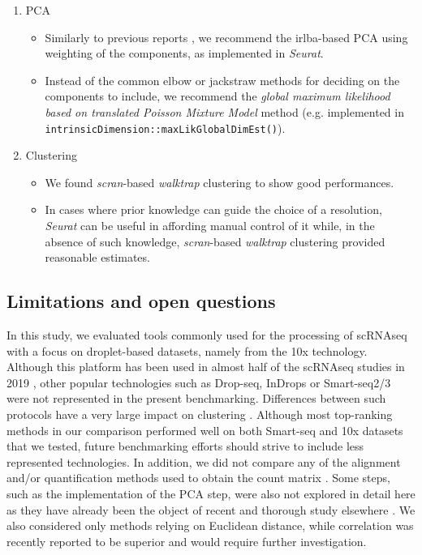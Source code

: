 \documentclass{bmcart}
\begin{document}
\begin{enumerate}
\begin{itemize}
   \end{itemize}
   \item PCA
   \begin{itemize}
     \item Similarly to previous reports \citep{SunDimRed2019}, we recommend the irlba-based PCA using weighting of the components, as implemented in \textit{Seurat}. 
     \item Instead of the common elbow or jackstraw methods for deciding on the components to include, we recommend the \textit{global maximum likelihood based on translated Poisson Mixture Model} method (e.g. implemented in \texttt{intrinsicDimension::maxLikGlobalDimEst()}).
   \end{itemize}
   \item Clustering
   \begin{itemize}
    \item We found \textit{scran}-based \textit{walktrap} clustering to show good performances.
    \item In cases where prior knowledge can guide the choice of a resolution, \textit{Seurat} can be useful in affording manual control of it while, in the absence of such knowledge, \textit{scran}-based \textit{walktrap} clustering provided reasonable estimates.
   \end{itemize}
\end{enumerate}



\subsection*{Limitations and open questions}

In this study, we evaluated tools commonly used for the processing of scRNAseq with a focus on droplet-based datasets, namely from the 10x technology. Although this platform has been used in almost half of the scRNAseq studies in 2019 \citep{SvenssonDB2019}, other popular technologies such as Drop-seq, InDrops or Smart-seq2/3 were not represented in the present benchmarking. Differences between such protocols have a very large impact on clustering \citep{MereuCellAtlas2019}. Although most top-ranking methods in our comparison performed well on both Smart-seq and 10x datasets that we tested, future benchmarking efforts should strive to include less represented technologies. In addition, we did not compare any of the alignment and/or quantification methods used to obtain the count matrix \citep{MereuCellAtlas2019}. Some steps, such as the implementation of the PCA step, were also not explored in detail here as they have already been the object of recent and thorough study elsewhere \citep{SunDimRed2019}. We also considered only methods relying on Euclidean distance, while correlation was recently reported to be superior\citep{kim_impact_2019} and would require further investigation.
\end{document}
